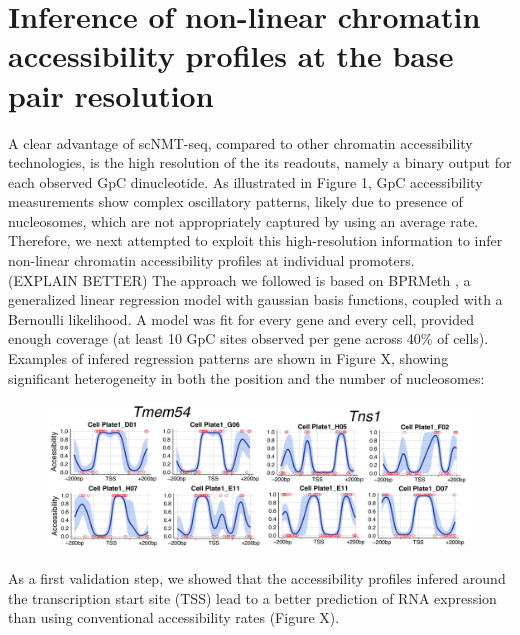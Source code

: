 \section{Inference of non-linear chromatin accessibility profiles at the base pair resolution}
A clear advantage of scNMT-seq, compared to other chromatin accessibility technologies, is the high resolution of the its readouts, namely a binary output for each observed GpC dinucleotide. As illustrated in Figure 1, GpC accessibility measurements show complex oscillatory patterns, likely due to presence of nucleosomes, which are not appropriately captured by using an average rate. Therefore, we next attempted to exploit this high-resolution information to infer non-linear chromatin accessibility profiles at individual promoters.\\
(EXPLAIN BETTER) The approach we followed is based on BPRMeth \cite{Kapourani2018}, a generalized linear regression model with gaussian basis functions, coupled with a Bernoulli likelihood. A model was fit for every gene and every cell, provided enough coverage (at least 10 GpC sites observed per gene across 40\% of cells).\\
 Examples of infered regression patterns are shown in Figure X, showing significant heterogeneity in both the position and the number of nucleosomes:

\begin{figure}[H]
	\centering
	\includegraphics[width=0.9\linewidth]{scNMT_profiles_examples}
	\caption[]{}
	\label{fig:scnmt_profiles_examples}
\end{figure}


As a first validation step, we showed that the accessibility profiles infered around the transcription start site (TSS) lead to a better prediction of RNA expression than using conventional accessibility rates (Figure X).

